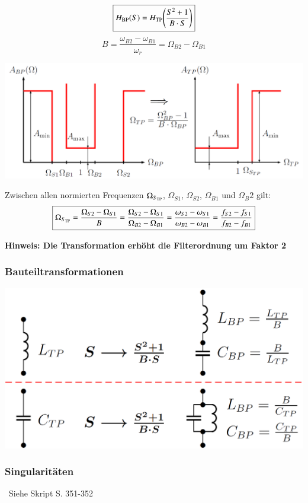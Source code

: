 \begin{minipage}[c]{0.4\columnwidth}
    $$ \boxed{H_{\rm BP}(S) = H_{\rm TP} \Bigg(\frac{S^2  + 1}{B \cdot S} \Bigg) } $$
    $$ \boxed{ B = \frac{\omega_{B2} - \omega_{B1}}{\omega_r} = \Omega_{B2} - \Omega_{B1} } $$
\end{minipage}
\hfill
\begin{minipage}[c]{0.58\columnwidth}
    \includegraphics[width=\columnwidth]{images/toleranzschema_BP_TP.png}
\end{minipage}

\vspace{0.2cm}
Zwischen allen normierten Frequenzen $\Omega_{S_{\rm TP}}$, $\Omega_{S1}$, $\Omega_{S2}$, $\Omega_{B1}$ und $\Omega_B2$ gilt:
$$ \boxed{ \Omega_{S_{\rm TP}} = \frac{\Omega_{S2} - \Omega_{S1}}{B} = \frac{\Omega_{S2} - \Omega_{S1}}{\Omega_{B2} - \Omega_{B1}}
    = \frac{\omega_{S2} - \omega_{S1}}{\omega_{B2} - \omega_{B1}} = \frac{f_{S2} - f_{S1}}{f_{B2} - f_{B1}} } $$

\textbf{Hinweis: Die Transformation erhöht die Filterordnung um Faktor 2}


\begin{minipage}[t]{0.48\columnwidth}
    \subsubsection{Bauteiltransformationen}

    \includegraphics[width=\columnwidth]{images/bauteiltransformation_TP_BP.png}
\end{minipage}
\hfill
\begin{minipage}[t]{0.48\columnwidth}
    \subsubsection{Singularitäten}

    \textrightarrow\ Siehe Skript S. 351-352
\end{minipage}



